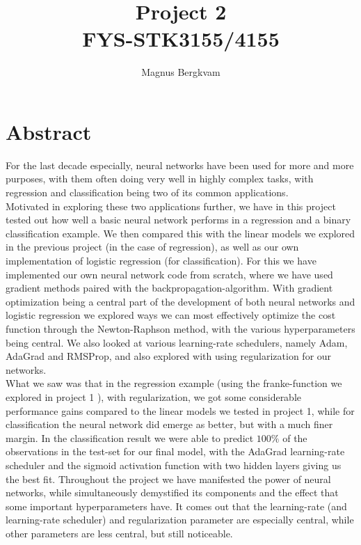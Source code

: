 \documentclass{article}
\title{Project 2 \\ FYS-STK3155/4155}
\author{Magnus Bergkvam}
\begin{document}
\maketitle


\section{Abstract}
For the last decade especially, neural networks have been used for more and
more purposes, with them often doing very well in highly complex tasks, with
regression and classification being two of its common applications.
\\

Motivated in exploring these two applications further, we have in this project
tested out how well a basic neural network performs in a regression and a binary
classification example. We then compared this with the linear models we explored
in the previous project \cite{githubrepoproject1} (in the case of regression),
as well as our own implementation of logistic regression (for classification).
For this we have implemented our own neural network code from scratch, where we
have used gradient methods paired with the backpropagation-algorithm.  With
gradient optimization being a central part of the development of both neural
networks and logistic regression we explored ways we can most effectively
optimize the cost function through the Newton-Raphson method, with the various
hyperparameters being central. We also looked at various learning-rate
schedulers, namely Adam, AdaGrad and RMSProp, and also explored with using
regularization for our networks.
\\

What we saw was that in the regression example (using the franke-function we
explored in project 1 \cite{githubrepoproject1}), with regularization, we got some
considerable performance gains compared to the linear models we tested in
project 1, while for classification the neural network did emerge as better, but
with a much finer margin. In the classification result we were able to predict
$100\%$ of the observations in the test-set for our final model, with the
AdaGrad learning-rate scheduler and the sigmoid activation function with two
hidden layers giving us the best fit. Throughout the project we have manifested
the power of neural networks, while simultaneously demystified its components
and the effect that some important hyperparameters have. It comes out that the
learning-rate (and learning-rate scheduler) and regularization parameter are
especially central, while other parameters are less central, but still noticeable.
\end{document}
